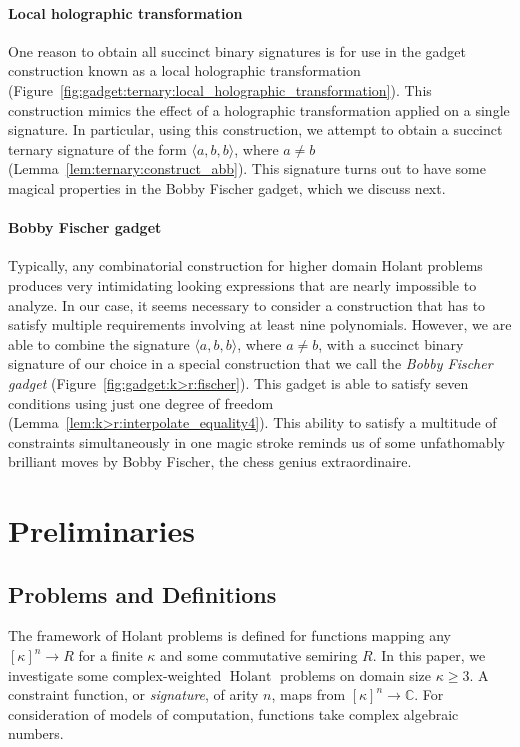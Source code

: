 \documentclass[11pt]{article}
\newcommand{\Holant}{\operatorname{Holant}}
\begin{document}
\paragraph{Local holographic transformation}
One reason to obtain all succinct binary signatures is for use in the gadget construction known as
a local holographic transformation (Figure~\ref{fig:gadget:ternary:local_holographic_transformation}).
This construction mimics the effect of a holographic transformation applied on a single signature.
In particular, 
using this construction,
we attempt to obtain a succinct ternary signature of the form $\langle a,b,b \rangle$,
where $a \not = b$ (Lemma~\ref{lem:ternary:construct_abb}).
This signature turns out to have some magical properties in the Bobby Fischer gadget,
which we discuss next.

\paragraph{Bobby Fischer gadget}
Typically,
any combinatorial construction for higher domain Holant problems produces very intimidating looking expressions that are nearly impossible to analyze.
In our case,
it seems necessary to consider a construction that has to satisfy multiple requirements involving at least nine polynomials.
However,
we are able to combine the signature $\langle a,b,b \rangle$,
where $a \not = b$,
with a succinct binary signature of our choice in a special construction that we call the \emph{Bobby Fischer gadget} (Figure~\ref{fig:gadget:k>r:fischer}).
This gadget is able to satisfy seven conditions using just one degree of freedom (Lemma~\ref{lem:k>r:interpolate_equality4}).
This ability to satisfy a multitude of constraints simultaneously in one magic stroke reminds us of some unfathomably brilliant moves by Bobby Fischer,
the chess genius extraordinaire.

\section{Preliminaries} \label{sec:preliminaries}

\subsection{Problems and Definitions}

The framework of Holant problems is defined for functions mapping any $[\kappa]^n \to R$ for a finite $\kappa$ and some commutative semiring $R$.
In this paper, we investigate some complex-weighted $\Holant$ problems on domain size $\kappa \ge 3$.
A constraint function, or \emph{signature}, of arity $n$, maps from $[\kappa]^n \to \mathbb{C}$.
For consideration of models of computation,
functions take complex algebraic numbers.
\end{document}

